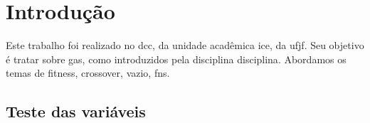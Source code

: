 \chapter{Introdução}%
\label{cap:introducao}


Este trabalho foi realizado no \gls{dcc}, da unidade acadêmica \gls{ice}, da \gls{ufjf}.
Seu objetivo é tratar sobre \glspl{ga}, como introduzidos pela disciplina \gls{disciplina}.
Abordamos os temas de \gls{fitness}, \gls{crossover}, \gls{vazio}, \glspl{fn}.

\section{Teste das variáveis}%
\label{sec:teste_variaveis}

\testaVariaveis{}

\lipsum[1-4]
